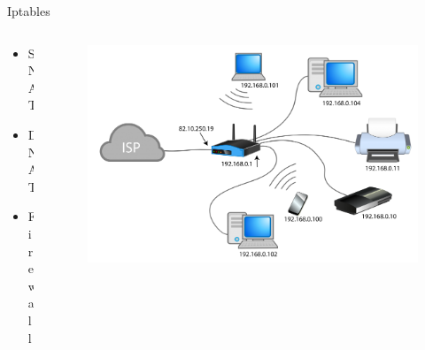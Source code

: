\documentclass[aspectratio=169,10pt,t]{beamer}
\begin{document}
\begin{frame}[t]{Iptables}
\begin{columns}
	\begin{column}{0.2\textwidth}
	\begin{itemize}
		\item SNAT
		\item DNAT
		\item Firewall
	\end{itemize}
		
	\end{column}
	\begin{column}{0.8\textwidth}
	\vspace{-1.1cm}
	\begin{figure}[h]
		\centering
		\includegraphics[width=1\linewidth]{Img/NAT.png}
	\end{figure}
		
	\end{column}
	
\end{columns}



\end{frame}
\end{document}
